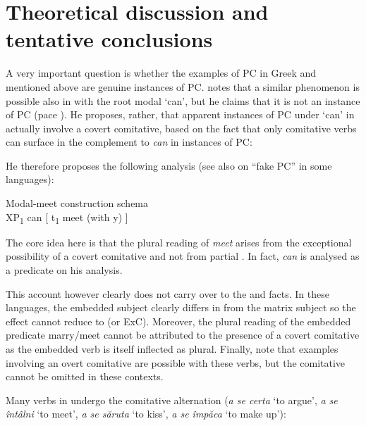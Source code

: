 \documentclass[output=paper]{langsci/langscibook}
\begin{document}
\section{Theoretical discussion and tentative conclusions}\label{sec:24.5}

A very important question is whether the examples of
\gls{PC} in Greek and  mentioned above are
genuine instances of PC. \citet{Poole2015} notes that a similar phenomenon is
possible also in  with the root modal ‘can’, but he claims that it is
not an instance of \gls{PC} (pace
\citealt{Rodrigues2007}). He proposes, rather, that apparent instances of
\gls{PC} under ‘can’ in  actually involve a
covert comitative, based on the fact that only comitative verbs can surface in
the complement to \emph{can} in instances of \gls{PC}:\largerpage

\ea%
    \label{ex:24.40} \textcite[14]{Poole2015}
	\z
\z

He therefore proposes the following analysis (see also \citealt{Sheehan2014c} on
\enquote{fake \gls{PC}} in some  languages):

\ea\label{ex:24.41} Modal-meet construction schema \parencite[15]{Poole2015}\\%
    XP\textsubscript{1} can [ t\textsubscript{1} meet (with y) ]
\z

The core idea here is that the plural reading of \emph{meet} arises from the
exceptional possibility of a covert comitative and not from partial . In
fact, \emph{can} is analysed as a  predicate on his
analysis.

This account however clearly does not carry over to the  and
 facts. In these languages, the embedded subject clearly differs in 
from the matrix subject so the effect cannot reduce to  (or \gls{ExC}).
Moreover, the plural reading of the embedded predicate marry/meet cannot be
attributed to the presence of a covert comitative as the embedded verb is
itself inflected as plural. Finally, note that examples involving an overt
comitative are possible with these verbs, but the comitative cannot be omitted
in these contexts.

Many verbs in  undergo the comitative alternation (\emph{a se certa}
‘to argue’, \emph{a se întâlni} ‘to meet’, \emph{a se săruta} ‘to kiss’,
\emph{a se împăca} ‘to make up’):
\end{document}
